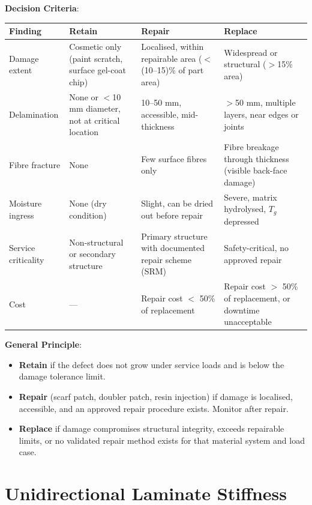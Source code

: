 \documentclass{NoteThesis/note-thesis}
\begin{document}
\textbf{Decision Criteria}:
\begin{table}[h]
    \centering
    \begin{tabular}{p{2cm}p{4.5cm}p{4.5cm}p{4cm}}
        \hline
        \textbf{Finding} & \textbf{Retain} & \textbf{Repair} & \textbf{Replace} \\
        \hline
        Damage extent & Cosmetic only (paint scratch, surface gel-coat chip) & Localised, within repairable area ($<$(10--15)\% of part area) & Widespread or structural ($>$15\% area) \\
        Delamination & None or $<$10 mm diameter, not at critical location & 10--50 mm, accessible, mid-thickness & $>$50 mm, multiple layers, near edges or joints \\
        Fibre fracture & None & Few surface fibres only & Fibre breakage through thickness (visible back-face damage) \\
        Moisture ingress & None (dry condition) & Slight, can be dried out before repair & Severe, matrix hydrolysed, $T_g$ depressed \\
        Service criticality & Non-structural or secondary structure & Primary structure with documented repair scheme (SRM) & Safety-critical, no approved repair \\
        Cost & — & Repair cost $<$ 50\% of replacement & Repair cost $>$ 50\% of replacement, or downtime unacceptable \\
        \hline
    \end{tabular}
\end{table}

\textbf{General Principle}:
\begin{itemize}
    \item \textbf{Retain} if the defect does not grow under service loads and is below the damage tolerance limit.
    \item \textbf{Repair} (scarf patch, doubler patch, resin injection) if damage is localised, accessible, and an approved repair procedure exists. Monitor after repair.
    \item \textbf{Replace} if damage compromises structural integrity, exceeds repairable limits, or no validated repair method exists for that material system and load case.
\end{itemize}

\newpage{}

\section{Unidirectional Laminate Stiffness}
\end{document}
